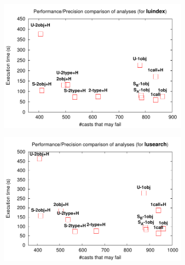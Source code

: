 \begin{figure}[tb!p]
\begin{center}
\begin{subfigure}[b]{0.45\textwidth}
\includegraphics[width=\textwidth]{assets/hybrid/luindex.pdf}
\end{subfigure}\hspace{1cm}%
\begin{subfigure}[b]{0.45\textwidth}
\includegraphics[width=\textwidth]{assets/hybrid/lusearch.pdf}
\end{subfigure}


\end{center}
\end{figure}
